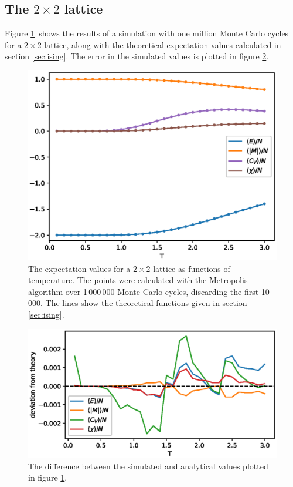 \documentclass[a4paper,10pt,onecolumn]{article}
\begin{document}
\subsection{The $2\times2$ lattice}
Figure \ref{fig:2x2} shows the results of a simulation with one million Monte Carlo cycles for a $2\times2$ lattice, along with the theoretical expectation values calculated in section \ref{sec:ising}. The error in the simulated values is plotted in figure \ref{fig:2x2err}.

\begin{figure}
	\centering
	\includegraphics[width=\linewidth]{2x2.eps}
	\caption{The expectation values for a $2\times2$ lattice as functions of temperature. The points were calculated with the Metropolis algorithm over 1\,000\,000 Monte Carlo cycles, discarding the first 10\,000. The lines show the theoretical functions given in section \ref{sec:ising}.}
	\label{fig:2x2}
\end{figure}

\begin{figure}
	\centering
	\includegraphics[width=\linewidth]{2x2err.eps}
	\caption{The difference between the simulated and analytical values plotted in figure \ref{fig:2x2}.}
	\label{fig:2x2err}
\end{figure}
\end{document}
